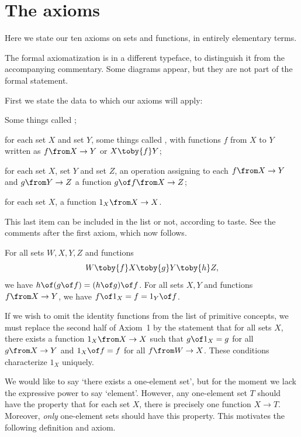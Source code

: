 \documentclass[12pt]{article}
\begin{document}
\section{The axioms} 
\label{sec:axioms}


Here we state our ten axioms on sets and functions, in entirely elementary
terms.

The formal axiomatization is in a \fmlon different typeface\fmloff, to
distinguish it from the accompanying commentary.  Some diagrams appear, but
they are not part of the formal statement.

First we state the data to which our axioms will apply:
% 
\fmlon
\begin{myitemize}
\item Some things called ;

\item for each set $X$ and set $Y$, some things called , with functions $f$ from $X$ to $Y$ written as $f\from
X \to Y$ or $X \toby{f} Y$;

\item for each set $X$, set $Y$ and set $Z$, an operation assigning to each
$f\from X \to Y$ and $g\from Y \to Z$ a function $g\of f\from X \to Z$;

\item for each set $X$, a function $1_X\from X \to X$.
\end{myitemize}
\fmloff

This last item can be included in the list or not, according to taste.  See
the comments after the first axiom, which now follows.


% 
\begin{axiom}
For all sets $W, X, Y, Z$ and functions 
\[
W \toby{f} X \toby{g} Y \toby{h} Z,
\]
we have $h \of (g\of f) = (h \of g) \of f$.  For all sets $X, Y$ and functions
$f\from X \to Y$, we have $f \of 1_X = f = 1_Y \of f$.
\end{axiom}

If we wish to omit the identity functions from the list of primitive
concepts, we must replace the second half of Axiom~1 by the statement
that for all sets $X$, there exists a function $1_X \from X \to X$ such
that $g \of 1_X = g$ for all $g\from X \to Y$ and $1_X \of f = f$ for all
$f\from W \to X$.  These conditions characterize $1_X$ uniquely.


% 
We would like to say `there exists a one-element set', but for the moment
we lack the expressive power to say `element'.  However, any one-element
set $T$ should have the property that for each set $X$, there is precisely
one function $X \to T$.  Moreover, \emph{only} one-element sets should have
this property.  This motivates the following definition and axiom.
\end{document}
